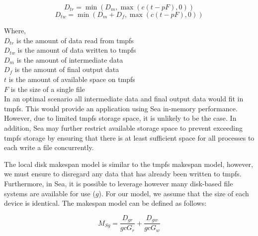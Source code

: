 \documentclass[10pt,journal,compsoc]{IEEEtran}
\begin{document}
      \begin{equation*}\label{eq:sea-comp:dtr}
          D_{tr} = \min\left(D_{m}, \max{\left(c(t - pF), 0 \right)} \right)
      \end{equation*}
      \begin{equation*}\label{eq:sea-comp:dtw}
          D_{tw} = \min\left(D_{m} + D_{f}, \max{\left(c(t - pF), 0 \right)} \right)
      \end{equation*}

      Where,\\
      $D_{tr}$ is the amount of data read from tmpfs \\
      $D_{tw}$ is the amount of data written to tmpfs \\
      $D_{m}$ is the amount of intermediate data \\
      $D_{f}$ is the amount of final output data \\
      $t$ is the amount of available space on tmpfs \\
      $F$ is the size of a single file \\

      In an optimal scenario all intermediate data and final output data would
      fit in tmpfs. This would provide an application using Sea in-memory
      performance. However, due to limited tmpfs storage space, it is unlikely
      to be the case. In addition, Sea may further restrict available storage
      space to prevent exceeding tmpfs storage by ensuring that there is at
      least sufficient space for all processes to each write a file
      concurrently.

      The local disk  makespan model is similar to the tmpfs makespan model,
      however, we must ensure to disregard any data that has already been
      written to tmpfs. Furthermore, in Sea, it is possible to leverage however
      many disk-based file systems are available for use ($g$). For our model,
      we assume that the size of each device is identical. The makespan model
      can be defined as follows:

      \begin{equation}\label{eq:sea-comp:msd}
          M_{Sg} =  \frac{D_{gr}}{gcG_{r}} + \frac{D_{gw}}{gcG_{w}}
      \end{equation}
\end{document}
